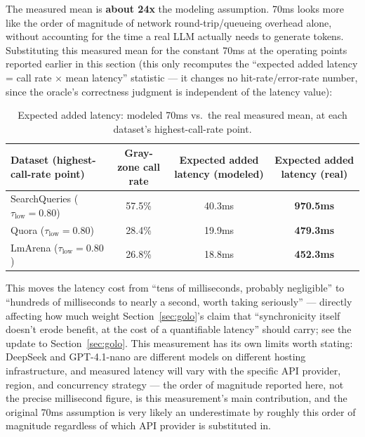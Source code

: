 \documentclass[11pt]{article}
\newcommand{\taulow}{\ensuremath{\tau_{\text{low}}}}
\newenvironment{fittab}{\begin{lrbox}{\fittabbox}}{\end{lrbox}%
  \ifdim\wd\fittabbox>\linewidth\resizebox{\linewidth}{!}{\usebox{\fittabbox}}\else\usebox{\fittabbox}\fi}
\begin{document}
The measured mean is \textbf{about 24x} the modeling assumption. 70ms looks more like the order of magnitude of network round-trip/queueing overhead alone, without accounting for the time a real LLM actually needs to generate tokens. Substituting this measured mean for the constant 70ms at the operating points reported earlier in this section (this only recomputes the ``expected added latency = call rate $\times$ mean latency'' statistic --- it changes no hit-rate/error-rate number, since the oracle's correctness judgment is independent of the latency value):

\begin{table}[h]
\centering
\small
\begin{fittab}\begin{tabular}{@{}lccc@{}}
\toprule
\textbf{Dataset (highest-call-rate point)} & \textbf{Gray-zone call rate} & \textbf{Expected added latency (modeled)} & \textbf{Expected added latency (real)} \\
\midrule
SearchQueries ($\taulow=0.80$) & 57.5\% & 40.3ms & \textbf{970.5ms} \\
Quora ($\taulow=0.80$) & 28.4\% & 19.9ms & \textbf{479.3ms} \\
LmArena ($\taulow=0.80$) & 26.8\% & 18.8ms & \textbf{452.3ms} \\
\bottomrule
\end{tabular}\end{fittab}
\caption{Expected added latency: modeled 70ms vs.\ the real measured mean, at each dataset's highest-call-rate point.}
\end{table}

This moves the latency cost from ``tens of milliseconds, probably negligible'' to ``hundreds of milliseconds to nearly a second, worth taking seriously'' --- directly affecting how much weight Section~\ref{sec:golo}'s claim that ``synchronicity itself doesn't erode benefit, at the cost of a quantifiable latency'' should carry; see the update to Section~\ref{sec:golo}. This measurement has its own limits worth stating: DeepSeek and GPT-4.1-nano are different models on different hosting infrastructure, and measured latency will vary with the specific API provider, region, and concurrency strategy --- the order of magnitude reported here, not the precise millisecond figure, is this measurement's main contribution, and the original 70ms assumption is very likely an underestimate by roughly this order of magnitude regardless of which API provider is substituted in.
\end{document}
